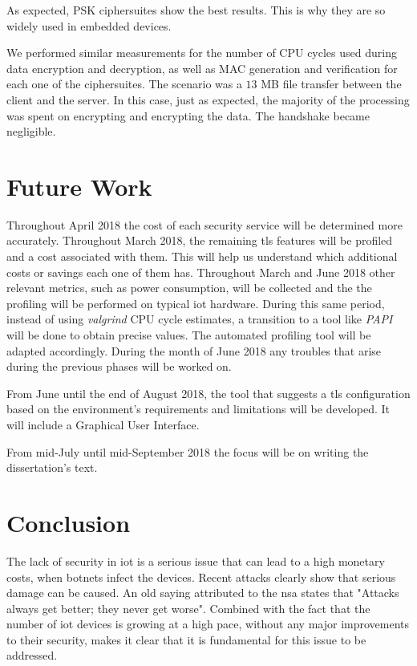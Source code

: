 \documentclass[conference]{IEEEtran}
\begin{document}
As expected, PSK ciphersuites show the best results. This is why they
are so widely used in embedded devices.

We performed similar measurements for the number of CPU cycles used
during data encryption and decryption, as well as MAC generation and verification for each one of the ciphersuites. The scenario was a $13$ MB file transfer between the client
and the server. In this case, just as expected, the majority of the
processing was spent on encrypting and encrypting the data. The handshake
became negligible.

\section{Future Work}

Throughout April 2018 the cost of each security service will be
determined more accurately. Throughout March 2018, the remaining
\gls{tls} features will be profiled and a cost associated with them.
This will help us understand which additional costs or savings
each one of them has. Throughout March and June 2018 other relevant metrics, such
as power consumption, will be collected and the the profiling
will be performed on typical \gls{iot} hardware. During this same
period, instead of using \textit{valgrind} CPU cycle estimates,
a transition to
a tool like \textit{PAPI}\cite{PAPI0:online} will be done to
obtain precise values. The automated profiling tool will be adapted accordingly. During the month of June 2018 any troubles
that arise during the previous phases will be worked on.

From June until the end of August 2018, the tool that suggests a \gls{tls}
configuration based on the environment's requirements and limitations
will be developed. It will include a Graphical User Interface.

From mid-July until mid-September 2018 the focus will be on writing
the dissertation's text.

\section{Conclusion}

The lack of security in \gls{iot} is a serious issue that can lead to a high monetary costs,
when botnets infect the devices. Recent
attacks clearly show that serious damage can be caused. An old saying attributed to the
\gls{nsa} states that "Attacks always get better; they never get worse".
Combined with the fact that the number of \gls{iot} devices is growing at a high
pace, without any major improvements to their security, makes it clear
that it is fundamental for this issue to be addressed.
\end{document}
